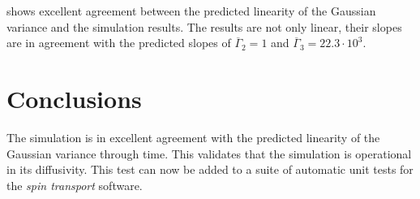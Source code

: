 \documentclass[onecolumn]{amsart}
\begin{document}
 shows excellent agreement between the predicted linearity of the Gaussian variance and the simulation results.
The results are not only linear, their slopes are in agreement with the predicted slopes of \(\overline{\Gamma}_2 = 1\) and \(\overline{\Gamma}_3 = 22.3\cdot 10^3\).

\section{Conclusions}
\label{sec:org6d61818}

The simulation is in excellent agreement with the predicted linearity of the Gaussian variance through time.
This validates that the simulation is operational in its diffusivity.
This test can now be added to a suite of automatic unit tests for the \emph{spin transport} software.



\end{document}
